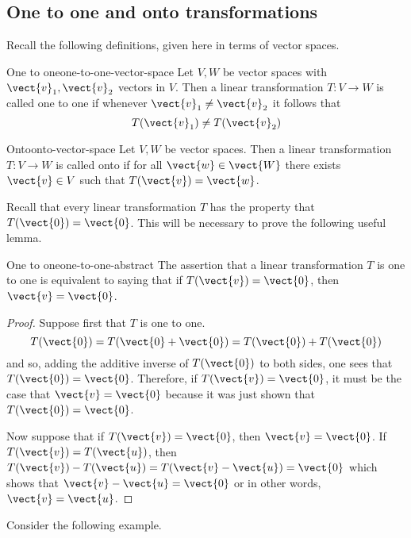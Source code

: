 \subsection{One to one and onto transformations}

Recall the following definitions, given here in terms of vector spaces.

\begin{definition}{One to one}{one-to-one-vector-space}
Let $V, W$ be vector spaces with $\vect{v}_1, \vect{v}_2$ vectors in $V$. Then a linear transformation $T: V \to W$ is called one to one if whenever $\vect{v}_1 \neq \vect{v}_2$ it follows that 
\[
T(\vect{v}_1) \neq T (\vect{v}_2)
\]
\end{definition}

\begin{definition}{Onto}{onto-vector-space}
Let $V, W$ be vector spaces. Then a linear transformation $T: V \to W$ is called onto if for all $\vect{w} \in \vect{W}$ there exists $\vect{v} \in V$ such that $T(\vect{v}) = \vect{w}$. 
\end{definition}

Recall that every linear transformation $T$ has the property that $T(\vect{0})=\vect{0}$. This will be necessary to prove the following useful lemma. 

\begin{lemma}{One to one}{one-to-one-abstract}
The assertion that a linear transformation $T$ is one to one is equivalent to
saying that if $T(\vect{v})=\vect{0}$, then $\vect{v}=\vect{0}$. 
\end{lemma}

\begin{proof}
Suppose first that $T$ is one to one. 
\begin{equation*}
T(\vect{0})=T(\vect{0}+\vect{0}) =T(\vect{0})+T(\vect{0})
\end{equation*}
and so, adding the additive inverse of $T(\vect{0})$ to both sides, one sees
that $T(\vect{0})=\vect{0}$. Therefore, if $T(\vect{v})=\vect{0}$, it must be the
case that $\vect{v}=\vect{0}$ because it was just shown that $T(\vect{0})=\vect{0}$.

Now suppose that if $T(\vect{v})=\vect{0}$, then $\vect{v}=\vect{0}$. If $T(\vect{v})=T(\vect{u})$, then $T(\vect{v})-T(\vect{u})=T(\vect{v}-\vect{u}) =\vect{0}$ which
shows that $\vect{v}-\vect{u}=\vect{0}$ or in other words, $\vect{v}=\vect{u}$. 
\end{proof}

Consider the following example.

